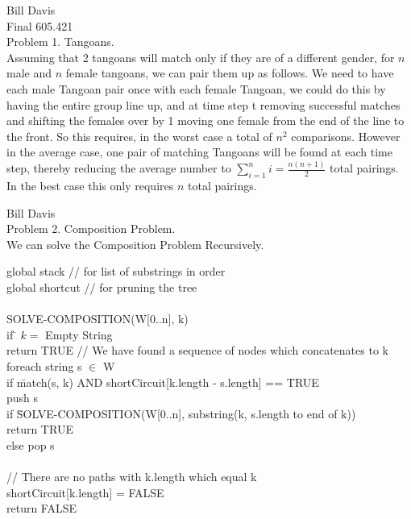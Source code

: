 \documentclass[11pt,fleqn]{article}
\begin{document}
\newcommand{\mbf}[1]{\mbox{{\bfseries #1}}}
\newcommand{\N}{\mbf{N}}
\renewcommand{\O}{\mbf{O}}

\noindent Bill Davis \\
Final 605.421 \\

Problem 1. Tangoans. \\
Assuming that 2 tangoans will match only if they are of a different gender, for $n$ male and $n$ female tangoans, we can pair them up as follows. We need to have each male Tangoan pair once with each female Tangoan, we could do this by having the entire group line up, and at time step t removing successful matches and shifting the females over by 1 moving one female from the end of the line to the front. So this requires, in the worst case a total of $n^{2}$ comparisons. However in the average case, one pair of matching Tangoans will be found at each time step, thereby reducing the average number to $\displaystyle\sum_{i=1}^n i = \frac{n(n+1)}{2}$ total pairings. In the best case this only requires $n$ total pairings. 

\pagebreak
Bill Davis\\
Problem 2. Composition Problem.\\
We can solve the Composition Problem Recursively. 

\begin{tabbing}
global stack          // for list of substrings in order \\
global shortcut       // for pruning the tree            \\
                                                         \\
SOLVE-COMPOSITION(W[0..n], k)  \\
if \= $k=$ Empty String        \\
\>  return TRUE // We have found a sequence of nodes which concatenates to k  \\
foreach string s $\in$ W       \\
\>  if \=match(s, k) AND shortCircuit[k.length - s.length] == TRUE \\
\> \>  push s \\
\> \>  if \= SOLVE-COMPOSITION(W[0..n], substring(k, s.length to end of k)) \\
\> \> \>  return TRUE \\
\> \>  else pop s \\
\\
// There are no paths with k.length which equal k\\
shortCircuit[k.length] = FALSE \\
return FALSE
\end{tabbing}
\end{document}
